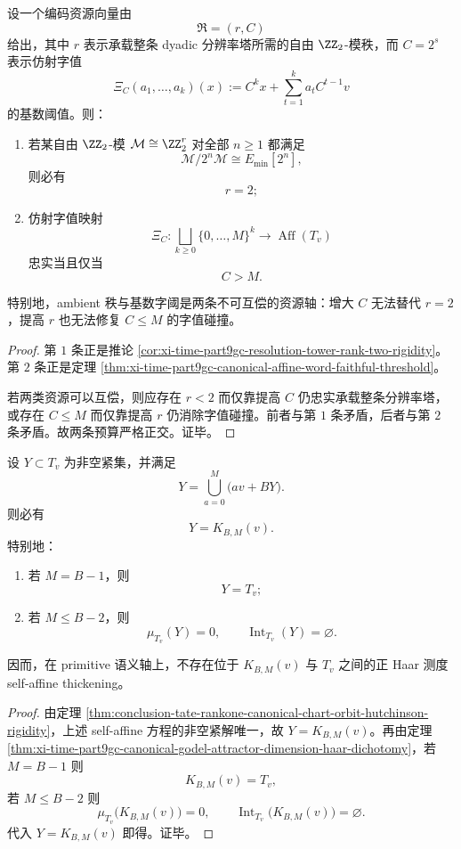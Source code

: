 \begin{theorem}[分辨率秩与字值阈值的二预算正交]\label{thm:conclusion-tate-rank-digit-threshold-orthogonality}
设一个编码资源向量由
\[
\mathfrak R=(r,C)
\]
给出，其中 \(r\) 表示承载整条 dyadic 分辨率塔所需的自由 \(\ZZ_2\)-模秩，而 \(C=2^s\) 表示仿射字值
\[
\Xi_C(a_1,\dots,a_k)(x):=
C^k x+\sum_{t=1}^{k}a_tC^{t-1}v
\]
的基数阈值。则：
\begin{enumerate}
  \item 若某自由 \(\ZZ_2\)-模 \(\mathcal M\cong \ZZ_2^r\) 对全部 \(n\ge 1\) 都满足
  \[
  \mathcal M/2^n\mathcal M\cong E_{\min}[2^n],
  \]
  则必有
  \[
  r=2;
  \]
  \item 仿射字值映射
  \[
  \Xi_C:\bigsqcup_{k\ge 0}\{0,\dots,M\}^k\longrightarrow \operatorname{Aff}(T_v)
  \]
  忠实当且仅当
  \[
  C>M.
  \]
\end{enumerate}
特别地，ambient 秩与基数字阈是两条不可互偿的资源轴：增大 \(C\) 无法替代 \(r=2\)，提高 \(r\) 也无法修复 \(C\le M\) 的字值碰撞。
\end{theorem}
\begin{proof}
第 \(1\) 条正是推论 \ref{cor:xi-time-part9gc-resolution-tower-rank-two-rigidity}。第 \(2\) 条正是定理 \ref{thm:xi-time-part9gc-canonical-affine-word-faithful-threshold}。

若两类资源可以互偿，则应存在 \(r<2\) 而仅靠提高 \(C\) 仍忠实承载整条分辨率塔，或存在 \(C\le M\) 而仅靠提高 \(r\) 仍消除字值碰撞。前者与第 \(1\) 条矛盾，后者与第 \(2\) 条矛盾。故两条预算严格正交。证毕。
\end{proof}

\begin{theorem}\label{thm:conclusion-tate-rankone-selfaffine-thickening-haar-rigidity}
设 \(Y\subset T_v\) 为非空紧集，并满足
\[
Y=\bigcup_{a=0}^{M}\bigl(av+BY\bigr).
\]
则必有
\[
Y=K_{B,M}(v).
\]
特别地：
\begin{enumerate}
  \item 若 \(M=B-1\)，则
  \[
  Y=T_v;
  \]
  \item 若 \(M\le B-2\)，则
  \[
  \mu_{T_v}(Y)=0,
  \qquad
  \operatorname{Int}_{T_v}(Y)=\varnothing.
  \]
\end{enumerate}
因而，在 primitive 语义轴上，不存在位于 \(K_{B,M}(v)\) 与 \(T_v\) 之间的正 Haar 测度 self-affine thickening。
\end{theorem}
\begin{proof}
由定理 \ref{thm:conclusion-tate-rankone-canonical-chart-orbit-hutchinson-rigidity}，上述 self-affine 方程的非空紧解唯一，故 \(Y=K_{B,M}(v)\)。再由定理 \ref{thm:xi-time-part9gc-canonical-godel-attractor-dimension-haar-dichotomy}，若 \(M=B-1\) 则
\[
K_{B,M}(v)=T_v,
\]
若 \(M\le B-2\) 则
\[
\mu_{T_v}\bigl(K_{B,M}(v)\bigr)=0,
\qquad
\operatorname{Int}_{T_v}\bigl(K_{B,M}(v)\bigr)=\varnothing.
\]
代入 \(Y=K_{B,M}(v)\) 即得。证毕。
\end{proof}

